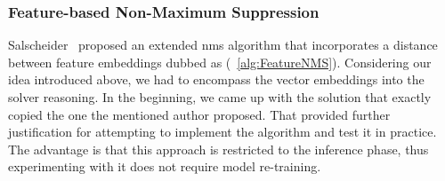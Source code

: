 \subsubsection{Feature-based Non-Maximum Suppression}
\label{sssec:FeatureNonMaximumSuppression}

Salscheider~\cite{salscheider2020featurenms} proposed an extended \gls{nms} algorithm that incorporates a distance between feature embeddings dubbed as \featurenms{} (\algtext{}~\ref{alg:FeatureNMS}). Considering our idea introduced above, we had to encompass the vector embeddings into the solver reasoning. In the beginning, we came up with the solution that exactly copied the one the mentioned author proposed. That provided further justification for attempting to implement the algorithm and test it in practice. The advantage is that this approach is restricted to the inference phase, thus experimenting with it does not require model re-training.

\def\threshlower{\tau_{\text{lower}}}
\def\threshupper{\tau_{\text{upper}}}
\def\threshsim{\delta}

